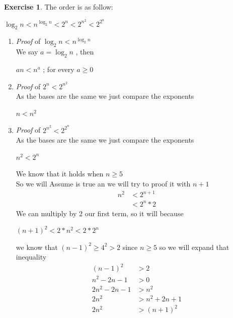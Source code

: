 \documentclass{article}
\theoremstyle{definition}
\newtheorem{exercise}{Exercise}[section]
\begin{document}
\begin{exercise}
    The order is as follow:
    \begin{center}
        $\log_2n<n^{\log_2n}<2^n<2^{n^2}<2^{2^n}$
    \end{center}
    \begin{enumerate}
        \item \textit{Proof} of $\log_2n<n^{\log_2n}$\\
            We say $a=\log_2n$ , then
            \begin{center}
                $an < n^a$ ; for every $a\geqslant0$
            \end{center}
        \item \textit{Proof} of $2^n<2^{n^2}$\\
            As the bases are the same we just compare the exponents
            \begin{center}
                $n<n^2$
            \end{center}
        \item \textit{Proof} of $2^{n^2}<2^{2^n}$\\
            As the bases are the same we just compare the exponents
            \begin{center}
                $n^2<2^n$
            \end{center}
            We know that it holds when $n\geqslant5$\\
            So we will Assume is true an we will try to proof it with $n+1$
            \begin{align*}
                n^2&<2^{n+1}\\
                &<2^n*2
            \end{align*}
            We can multiply by 2 our first term, so it will because
            \begin{center}
                $(n+1)^2<2 * n^2 < 2 * 2^n$
            \end{center}
            we know that $(n-1)^2 \geqslant 4^2 > 2$ since $n\geqslant5$ so we will expand that inequality
            \begin{align*}
                (n-1)^2 &> 2\\
                n^2 - 2n -1 &>0\\
                2n^2 -2n -1 &>n^2\\
                2n^2 &> n^2 + 2n +1\\
                2n^2 &> (n+1)^2\\
            \end{align*}

        
        
        
    \end{enumerate}
\end{exercise}
\end{document}
